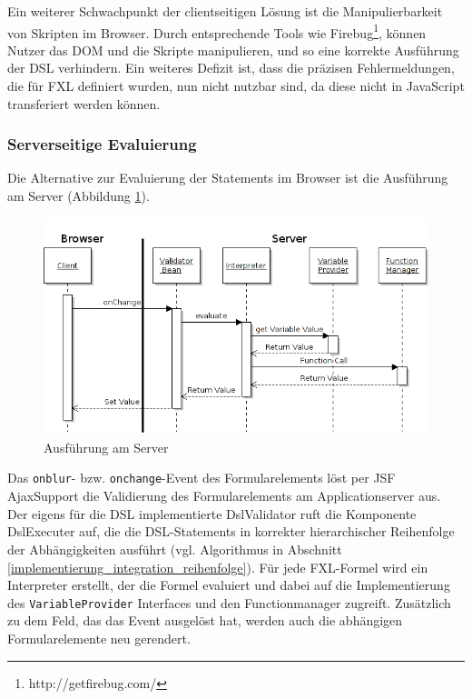 Ein weiterer Schwachpunkt der clientseitigen Lösung ist die Manipulierbarkeit von Skripten im Browser. Durch ent\-sprech\-ende Tools wie Firebug\footnote{http://getfirebug.com/}, können Nutzer das DOM und die Skripte manipulieren, und so eine korrekte Aus\-führ\-ung der DSL verhindern. Ein weiteres Defizit ist, dass die präzisen Fehlermeldungen, die für FXL definiert wurden, nun nicht nutzbar sind, da diese nicht in Java\-Script transferiert werden können.

\subsubsection{Serverseitige Evaluierung}

Die Alternative zur Evaluierung der Statements im Browser ist die Aus\-führ\-ung am Server (Abbildung \ref{abb_uml_seq_server}).

\begin{figure}[ht]
\includegraphics[scale=0.55]{figures/uml_seq_server_neu}
\caption{Aus\-führ\-ung am Server}
\label{abb_uml_seq_server}
\end{figure}

Das \texttt{onblur}- bzw. \texttt{onchange}-Event des Formularelements löst per JSF Ajax\-Support die Validierung des Formularelements am Applicationserver aus. Der eigens für die DSL implementierte DslValidator ruft die Komponente DslExecuter auf, die die DSL-Statements in korrekter hierarchischer Reihenfolge der Abhängigkeiten ausführt (vgl. Algorithmus in Abschnitt \ref{implementierung_integration_reihenfolge}). Für jede FXL-Formel wird ein Interpreter erstellt, der die Formel evaluiert und dabei auf die Implementierung des \texttt{VariableProvider} Interfaces und den Functionmanager zugreift. Zu\-sätz\-lich zu dem Feld, das das Event ausgelöst hat, werden auch die abhängigen Formularelemente neu gerendert.

